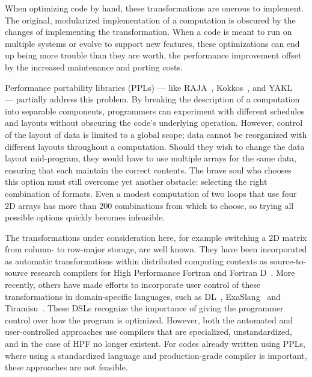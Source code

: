 When optimizing code by hand, these transformations are onerous to implement.
The original, modularized implementation of a computation is obscured by the changes of implementing the transformation. 
When a code is meant to run on multiple systems or evolve to support new features, these optimizations can end up being more trouble than they are worth, the performance improvement offset by the increased maintenance and porting costs.

Performance portability libraries (PPLs) --- like RAJA~\cite{hornung2014RAJA}, Kokkos~\cite{edwards2014kokkos}, and YAKL~\cite{norman2022portable} --- partially address this problem.
By breaking the description of a computation into separable components, programmers can experiment with different schedules and layouts without obscuring the code's underlying operation.
However, control of the layout of data is limited to a global scope; data cannot be reorganized with different layouts throughout a computation.
Should they wish to change the data layout mid-program, they would have to use multiple arrays for the same data, ensuring that each maintain the correct contents.
The brave soul who chooses this option must still overcome yet another obstacle: selecting the right combination of formats.
Even a modest computation of two loops that use four 2D arrays has more than 200 combinations from which to choose, so trying all possible options quickly becomes infeasible. 

The transformations under consideration here, for example switching a 2D matrix from column- to row-major storage, are well known.
They have been incorporated as automatic transformations within distributed computing contexts as source-to-source research compilers for High Performance Fortran and Fortran D~\cite{bixby1994automatic,kennedy1995automatic,kennedy1998automatic}.
More recently, others have made efforts to incorporate user control of these transformations in domain-specific languages, such as DL~\cite{sung2012dl}, ExaSlang~\cite{kronawitter2018automatic} and Tiramisu~\cite{baghdadi2019tiramisu}.
These DSLs recognize the importance of giving the programmer control over how the program is optimized. %
However, both the automated and user-controlled approaches use compilers that are specialized, unstandardized, and in the case of HPF no longer existent.
For codes already written using PPLs, where using a standardized language and production-grade compiler is important, these approaches are not feasible.

